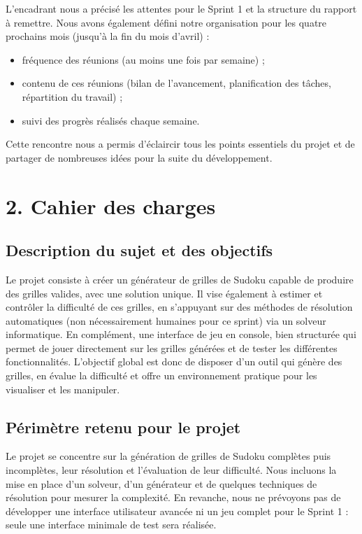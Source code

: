 \documentclass[a4paper]{article}
\begin{document}
L’encadrant nous a précisé les attentes pour le Sprint 1 et la structure du rapport à remettre.
Nous avons également défini notre organisation pour les quatre prochains mois (jusqu’à la fin du mois d’avril) :
\begin{itemize}
\item fréquence des réunions (au moins une fois par semaine) ;
\item contenu de ces réunions (bilan de l’avancement, planification des tâches, répartition du travail) ;
\item suivi des progrès réalisés chaque semaine.
\end{itemize}

Cette rencontre nous a permis d’éclaircir tous les points essentiels du projet et de partager de nombreuses idées pour la suite du développement.

\section*{2. Cahier des charges}
\subsection*{Description du sujet et des objectifs}
Le projet consiste à créer un générateur de grilles de Sudoku capable de produire des grilles valides, avec une solution unique.
Il vise également à estimer et contrôler la difficulté de ces grilles, en s’appuyant sur des méthodes de résolution automatiques (non nécessairement humaines pour ce sprint) via un solveur informatique.
En complément, une interface de jeu en console, bien structurée qui permet de jouer directement sur les grilles générées et de tester les différentes fonctionnalités. 
L’objectif global est donc de disposer d’un outil qui génère des grilles, en évalue la difficulté et offre un environnement pratique pour les visualiser et les manipuler.

\subsection*{Périmètre retenu pour le projet}
Le projet se concentre sur la génération de grilles de Sudoku complètes puis incomplètes, leur résolution et l’évaluation de leur difficulté. Nous incluons la mise en place d’un solveur, d’un générateur et de quelques techniques de résolution pour mesurer la complexité.
En revanche, nous ne prévoyons pas de développer une interface utilisateur avancée ni un jeu complet pour le Sprint 1 : seule une interface minimale de test sera réalisée.
\end{document}
